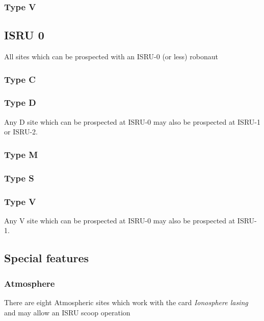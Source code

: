 \documentclass[a4paper,table,fontsize=8pt,DIV=6,enabledeprecatedfontcommands]{scrbook}
\begin{document}
\subsubsection{Type V}

\subsection{ISRU 0}
All sites which can be prospected with an ISRU-0 (or less) robonaut
\subsubsection{Type C}
\subsubsection{Type D}
Any D site which can be prospected at ISRU-0 may also be prospected at ISRU-1 or ISRU-2.
\subsubsection{Type M}
\subsubsection{Type S}
\subsubsection{Type V}
Any V site which can be prospected at ISRU-0 may also be prospected at ISRU-1.

\subsection{Special features}
\subsubsection{Atmosphere}
There are eight Atmospheric sites which work with the card \textit{Ionosphere lasing} and may allow an ISRU scoop operation
\end{document}
